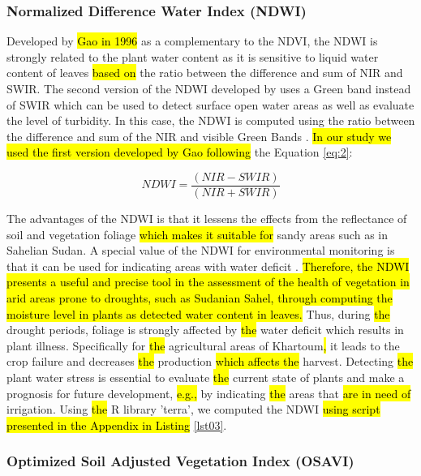 \documentclass[jimaging,article,submit,pdftex,moreauthors]{Definitions/mdpi}
\begin{document}
\subsubsection{Normalized Difference Water Index (NDWI)}

Developed by \hl{Gao in 1996 }\cite{GAO1996257} as a complementary to the NDVI, the NDWI is strongly related to the plant water content as it is sensitive to liquid water content of leaves \hl{based on} the ratio between the difference and sum of NIR and SWIR. The second version of the NDWI developed by \cite{rs5073544} uses a Green band instead of SWIR which can be used to detect surface open water areas as well as evaluate the level of turbidity. In this case, the NDWI is computed using the ratio between the difference and sum of the NIR and visible Green Bands \cite{ZHENG2021129488}. \hl{In our study we used the first version developed by Gao following }the Equation \ref{eq:2}:

\begin{equation}\label{eq:2}
	NDWI=\dfrac{(NIR-SWIR)}{(NIR+SWIR)}
\end{equation}

The advantages of the NDWI is that it lessens the effects from the reflectance of soil and vegetation foliage\hl{ which makes it suitable for }sandy areas such as in Sahelian Sudan. A special value of the NDWI for environmental monitoring is that it can be used for indicating areas with water deficit \cite{TENG2021107260}. \hl{Therefore, the NDWI presents a useful and precise tool in the assessment of the health of vegetation in arid areas prone to droughts, such as Sudanian Sahel, through computing the moisture level in plants as detected water content in leaves. }Thus, during \hl{the }drought periods, foliage is strongly affected by \hl{the }water deficit which results in plant illness. Specifically for \hl{the }agricultural areas of Khartoum\hl{, }it leads to the crop failure and decreases \hl{the }production \hl{which affects the} harvest. Detecting \hl{the }plant water stress is essential to evaluate \hl{the }current state of plants and make a prognosis for future development, \hl{e.g.,} by indicating \hl{the }areas that \hl{are in need of} irrigation. Using \hl{the }R library 'terra', we computed the NDWI \hl{using script presented in the Appendix in Listing} \ref{lst03}.

\subsubsection{Optimized Soil Adjusted Vegetation Index (OSAVI)}
\end{document}
